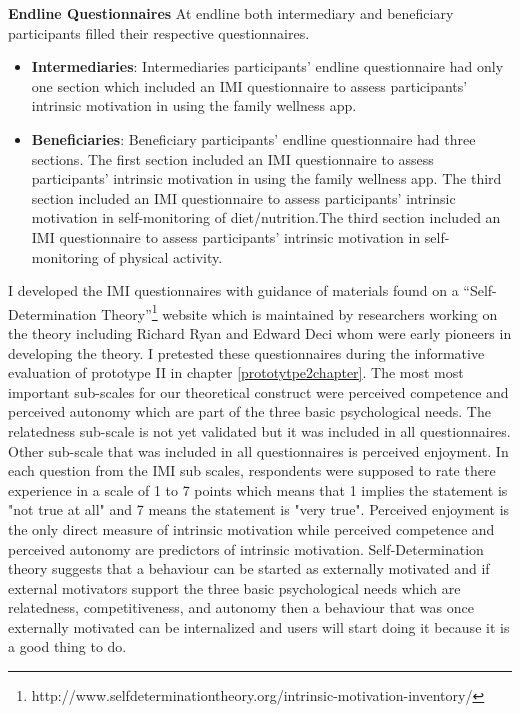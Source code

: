 \textbf{Endline Questionnaires}
At endline both intermediary and beneficiary participants filled their respective questionnaires. 
\begin{itemize}
\item{\textbf{Intermediaries}}: Intermediaries participants' endline questionnaire had only one section which included an IMI questionnaire  to assess participants' intrinsic motivation in using the family wellness app.
\item{\textbf{Beneficiaries}}: Beneficiary participants' endline questionnaire had three sections. The first section included an IMI questionnaire  to assess participants' intrinsic motivation in using the family wellness app. The third section included an IMI questionnaire to assess participants' intrinsic motivation in self-monitoring of diet/nutrition.The third section included an IMI questionnaire to assess participants' intrinsic motivation in self-monitoring of physical activity.
\end{itemize}

I developed the IMI questionnaires with guidance of materials found on a ``Self-Determination Theory''\footnote{http://www.selfdeterminationtheory.org/intrinsic-motivation-inventory/} website which is maintained by researchers working on the theory including Richard Ryan and Edward Deci\citep{deci1985intrinsic} whom were early pioneers in developing the theory. I pretested these questionnaires during the informative evaluation of prototype II in chapter \ref{prototytpe2chapter}.  The most most important sub-scales for our theoretical construct were perceived competence and perceived autonomy which are part of the three basic psychological needs. The relatedness sub-scale is not yet validated but it was included in all questionnaires. Other sub-scale that was included in all questionnaires is perceived enjoyment. In each question from the IMI sub scales, respondents were supposed to rate there experience in a scale of 1 to 7 points which means that 1 implies the statement is "not true at all" and 7 means the statement is "very true". \newline
Perceived enjoyment is the only direct measure of intrinsic motivation while perceived competence and perceived autonomy are predictors of intrinsic motivation. Self-Determination theory suggests that a behaviour can be started as externally motivated and if external motivators support the three basic psychological needs which are relatedness, competitiveness, and autonomy then a behaviour that was once externally motivated can be internalized and users will start doing it because it is a good thing to do.


